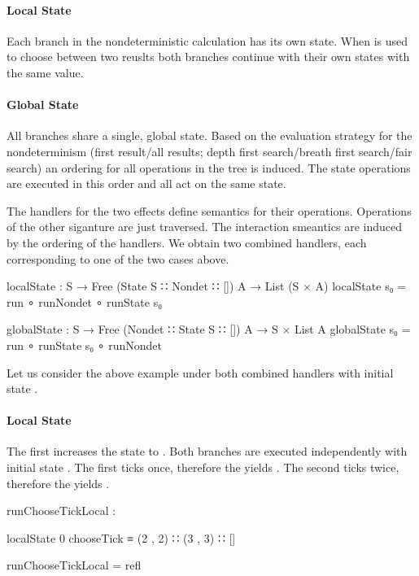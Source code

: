 \paragraph{Local State}
Each branch in the nondeterministic calculation has its own state.
When  is used to choose between two reuslts both branches
continue with their own states with the same value.
\paragraph{Global State}
All branches share a single, global state.
Based on the evaluation strategy for the nondeterminism (first result/all
results; depth first search/breath first search/fair search) an ordering for all
operations in the tree is induced.
The state operations are executed in this order and all act on the same state.

The handlers for the two effects define semantics for their operations.
Operations of the other siganture are just traversed.
The interaction smeantics are induced by the ordering of the handlers.
We obtain two combined handlers, each corresponding to one of the two cases
above.

\begin{code}
localState : S → Free (State S ∷ Nondet ∷ []) A → List (S × A)
localState s₀ = run ∘ runNondet ∘ runState s₀

globalState : S → Free (Nondet ∷ State S ∷ []) A → S × List A
globalState s₀ = run ∘ runState s₀ ∘ runNondet
\end{code}
Let us consider the above example under both combined handlers with initial
state .

\paragraph{Local State}
The first  increases the state to .
Both branches are executed independently with initial state .
The first ticks once, therefore the  yields .
The second ticks twice, therefore the  yields .

\begin{center}
\begin{code}
runChooseTickLocal :
\end{code}
\begin{code}[inline]
 localState 0 chooseTick ≡ (2 , 2) ∷ (3 , 3) ∷ []
\end{code}
\begin{code}
runChooseTickLocal = refl
\end{code}
\end{center}

